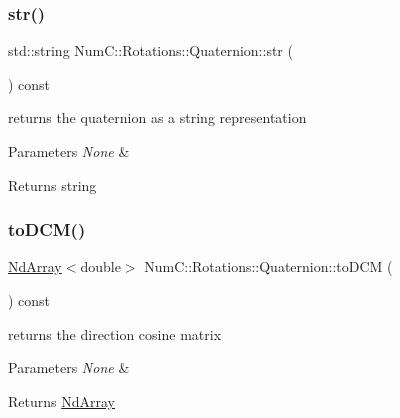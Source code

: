 \subsubsection{\texorpdfstring{str()}{str()}}
{\footnotesize\ttfamily std\+::string Num\+C\+::\+Rotations\+::\+Quaternion\+::str (\begin{DoxyParamCaption}{ }\end{DoxyParamCaption}) const\hspace{0.3cm}{\ttfamily [inline]}}

returns the quaternion as a string representation


\begin{DoxyParams}{Parameters}
{\em None} & \\
\hline
\end{DoxyParams}
\begin{DoxyReturn}{Returns}
string 
\end{DoxyReturn}
\mbox{\label{class_num_c_1_1_rotations_1_1_quaternion_a1c1434c74c57d4dbf9d4cfcc1a1cb9cf}} 
\subsubsection{\texorpdfstring{to\+D\+C\+M()}{toDCM()}}
{\footnotesize\ttfamily \mbox{\hyperlink{class_num_c_1_1_nd_array}{Nd\+Array}}$<$double$>$ Num\+C\+::\+Rotations\+::\+Quaternion\+::to\+D\+CM (\begin{DoxyParamCaption}{ }\end{DoxyParamCaption}) const\hspace{0.3cm}{\ttfamily [inline]}}

returns the direction cosine matrix


\begin{DoxyParams}{Parameters}
{\em None} & \\
\hline
\end{DoxyParams}
\begin{DoxyReturn}{Returns}
\mbox{\hyperlink{class_num_c_1_1_nd_array}{Nd\+Array}} 
\end{DoxyReturn}
\mbox{\label{class_num_c_1_1_rotations_1_1_quaternion_a3a1199a8d661891685ab281166217210}} 

